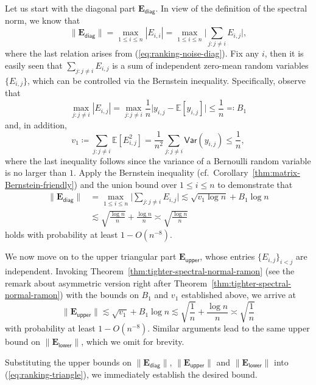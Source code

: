 Let us start with the diagonal part $\bm{E}_{\mathsf{diag}}$.
In view of the definition of the spectral norm, we know that
%
\[
\|\bm{E}_{\mathsf{diag}}\|=\max_{1\leq i\leq n}|E_{i,i}|=\max_{1\leq i\leq n} \Big| \sum_{j:j\neq i}E_{i,j} \Big|,
\]
%
where the last relation arises from (\ref{eq:ranking-noise-diag}). Fix any
$i$, then it is easily seen that $\sum_{j:j\neq i}E_{i,j}$ is a sum of
independent zero-mean random variables $\{E_{i,j}\}$, which can be controlled via the Bernstein inequality.
Specifically, observe that
%
\[
\max_{j:j\neq i}|E_{i,j}|=\max_{j:j\neq i} \frac{1}{n} \big| y_{i,j}-\mathbb{E} [ y_{i,j}]   \big|
\leq\frac{1}{n} \eqqcolon B_1
\]
%
and,  in addition,
%
\[
	v_1\coloneqq\sum_{j:j\neq i}\mathbb{E}[E_{i,j}^{2}]=\frac{1}{n^{2}}\sum_{j:j\neq i}\mathsf{Var}\left(y_{i,j}\right)\leq\frac{1}{n},
\]
%
where the last inequality follows since the variance of a Bernoulli random variable is no larger than $1$.
Apply the Bernstein inequality (cf.~Corollary~\ref{thm:matrix-Bernstein-friendly}) and the union
bound over $1\leq i\leq n$ to demonstrate that
%
\begin{align*}
	\|\bm{E}_{\mathsf{diag}}\| & =\max_{1\leq i\leq n} \Big|\sum_{j:j\neq i}E_{i,j} \Big|
	\lesssim \sqrt{v_1\log n} + B_1 \log n   \\
	& \lesssim  \sqrt{\frac{\log n}{n}}+\frac{\log n}{n}\asymp\sqrt{\frac{\log n}{n}}
\end{align*}
%
holds with probability at least $1-O(n^{-8})$.

We now move on to the upper triangular part $\bm{E}_{\mathsf{upper}}$,
whose entries $\{E_{i,j}\}_{i<j}$ are independent. Invoking Theorem~\ref{thm:tighter-spectral-normal-ramon} (see the remark about asymmetric version right after Theorem~\ref{thm:tighter-spectral-normal-ramon}) with the bounds on $B_1$ and $v_1$ established above,
we arrive at
%
\[
	\|\bm{E}_{\mathsf{upper}}\|\lesssim \sqrt{v_1 } + B_1 \log n \lesssim \sqrt{\frac{1}{n}} + \frac{\log n}{n} \asymp  \sqrt{\frac{1}{n}}
\]
with probability at least $1-O(n^{-8})$. Similar arguments lead to
the same upper bound on $\|\bm{E}_{\mathsf{lower}}\|$, which
we omit  for brevity.

Substituting the upper bounds on $\|\bm{E}_{\mathsf{diag}}\|$, $\|\bm{E}_{\mathsf{upper}}\|$ and $\|\bm{E}_{\mathsf{lower}}\|$ into (\ref{eq:ranking-triangle}), we immediately establish
the desired bound.



